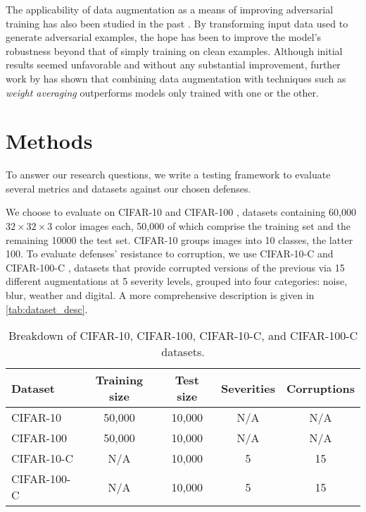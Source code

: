 \documentclass[a4paper]{article}
\begin{document}
\noindent
The applicability of data augmentation as a means of improving adversarial
training has also been studied in the past
\cites{rice2020overfitting, gowal2021uncovering}. By transforming input data
used to generate adversarial examples, the hope has been to improve the model's
robustness beyond that of simply training on clean examples. Although initial
results seemed unfavorable and without any substantial improvement, further work
by \textcite{rebuffi2021dataaugmentation} has shown that combining data
augmentation with techniques such as \textit{weight averaging} outperforms
models only trained with one or the other.


\section{Methods}

To answer our research questions, we write a testing framework to evaluate
several metrics and datasets against our chosen defenses. 

We choose to evaluate on CIFAR-10 and CIFAR-100
\cite{krizhevsky2009learning},
datasets containing 60,000 $32 \times 32 \times 3$ color images each, 50,000 of
which comprise the training set and the remaining 10000 the test set.
CIFAR-10 groups images into 10 classes, the latter 100. To evaluate defenses'
resistance to corruption, we use CIFAR-10-C and CIFAR-100-C
\cite{hendrycks2019benchmarking},
datasets that provide corrupted versions of the previous via 15 different
augmentations at 5 severity levels, grouped into four categories: noise, blur,
weather and digital. A more comprehensive description is given in
\autoref{tab:dataset_desc}.

\begin{table}[h]
    \centering
    \begin{tabular}{|l|c|c|c|c|}
        \hline
        \textbf{Dataset} & Training size & Test size & Severities & Corruptions \\
        \hline
        CIFAR-10 & 50,000 & 10,000 & N/A & N/A \\
        CIFAR-100 & 50,000 & 10,000 & N/A & N/A \\
        CIFAR-10-C & N/A & 10,000 & 5 & 15 \\
        CIFAR-100-C & N/A & 10,000 & 5 & 15 \\
        \hline
    \end{tabular}
    \caption{Breakdown of CIFAR-10, CIFAR-100, CIFAR-10-C, and CIFAR-100-C datasets.}
    \label{tab:dataset_desc}
\end{table}
\end{document}
